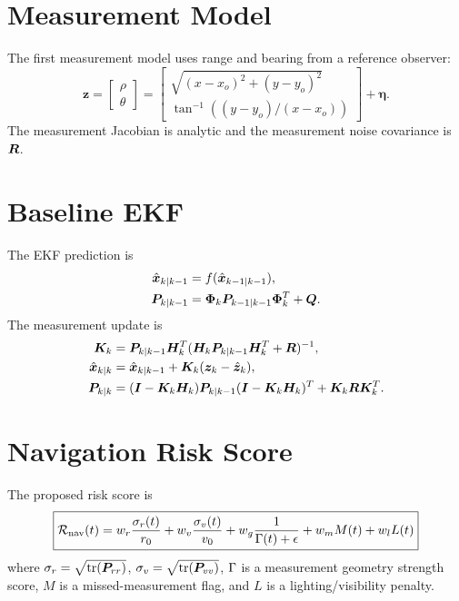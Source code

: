 \documentclass[11pt]{article}
\begin{document}
\section{Measurement Model}

The first measurement model uses range and bearing from a reference observer:
\begin{equation}
  \bm{z} =
  \begin{bmatrix}
  \rho\\
  \theta
  \end{bmatrix}
  =
  \begin{bmatrix}
  \sqrt{(x-x_o)^2+(y-y_o)^2}\\
  \tan^{-1}\left((y-y_o)/(x-x_o)\right)
  \end{bmatrix}
  + \bm{\eta}.
\end{equation}
The measurement Jacobian is analytic and the measurement noise covariance is
$\bm{R}$.

\section{Baseline EKF}

The EKF prediction is
\begin{align}
  \hat{\bm{x}}_{k|k-1} &= f(\hat{\bm{x}}_{k-1|k-1}),\\
  \bm{P}_{k|k-1} &= \bm{\Phi}_k \bm{P}_{k-1|k-1}\bm{\Phi}_k^T + \bm{Q}.
\end{align}
The measurement update is
\begin{align}
  \bm{K}_k &= \bm{P}_{k|k-1}\bm{H}_k^T
  (\bm{H}_k\bm{P}_{k|k-1}\bm{H}_k^T+\bm{R})^{-1},\\
  \hat{\bm{x}}_{k|k} &= \hat{\bm{x}}_{k|k-1}
  + \bm{K}_k(\bm{z}_k-\hat{\bm{z}}_k),\\
  \bm{P}_{k|k} &= (\bm{I}-\bm{K}_k\bm{H}_k)\bm{P}_{k|k-1}
  (\bm{I}-\bm{K}_k\bm{H}_k)^T + \bm{K}_k\bm{R}\bm{K}_k^T.
\end{align}

\section{Navigation Risk Score}

The proposed risk score is
\begin{equation}
\boxed{
\mathcal{R}_{\mathrm{nav}}(t)
=
w_r \frac{\sigma_r(t)}{r_0}
+
w_v \frac{\sigma_v(t)}{v_0}
+
w_g \frac{1}{\Gamma(t)+\epsilon}
+
w_m M(t)
+
w_l L(t)
}
\end{equation}
where $\sigma_r=\sqrt{\mathrm{tr}(\bm{P}_{rr})}$,
$\sigma_v=\sqrt{\mathrm{tr}(\bm{P}_{vv})}$, $\Gamma$ is a measurement
geometry strength score, $M$ is a missed-measurement flag, and $L$ is a
lighting/visibility penalty.
\end{document}
